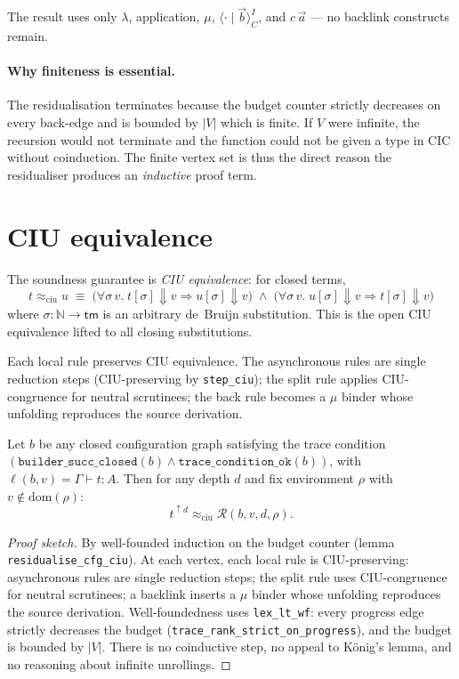 \documentclass[runningheads]{llncs}
\newcommand{\ciu}{\approx_{\mathrm{ciu}}}
\newcommand{\tconf}[3]{#1 \vdash #2 : #3}
\begin{document}
The result uses only $\lambda$, application, $\mu$, $\langle \cdot \mid \vec{b} \rangle^I_C$,
and $c\,\vec{a}$ — no backlink constructs remain.

\paragraph{Why finiteness is essential.}
The residualisation terminates because the budget counter strictly
decreases on every back-edge and is bounded by $|V|$ which is finite.
If $V$ were infinite, the recursion would not terminate and the function
could not be given a type in CIC without coinduction.  The finite vertex
set is thus the direct reason the residualiser produces an \emph{inductive}
proof term.

\section{CIU equivalence}

The soundness guarantee is \emph{CIU equivalence}: for closed terms,
\[
  t \ciu u \;\equiv\;
  \bigl(\forall \sigma\, v.\; t[\sigma] \Downarrow v \Rightarrow u[\sigma] \Downarrow v\bigr)
  \;\wedge\;
  \bigl(\forall \sigma\, v.\; u[\sigma] \Downarrow v \Rightarrow t[\sigma] \Downarrow v\bigr)
\]
where $\sigma : \mathbb{N} \to \mathsf{tm}$ is an arbitrary de~Bruijn
substitution.  This is the open CIU equivalence lifted to all closing
substitutions.

Each local rule preserves CIU equivalence.  The asynchronous rules are
single reduction steps (CIU-preserving by \texttt{step\_ciu}); the split
rule applies CIU-congruence for neutral scrutinees; the back rule becomes a
$\mu$ binder whose unfolding reproduces the source derivation.
\begin{theorem}
\label{thm:ciu}
Let $b$ be any closed configuration graph satisfying the trace condition
$(\texttt{builder\_succ\_closed}(b) \wedge \texttt{trace\_condition\_ok}(b))$,
with $\ell(b,v) = \tconf{\Gamma}{t}{A}$.  Then for any depth $d$ and fix
environment $\rho$ with $v\notin\mathrm{dom}(\rho)$:
\[
  t^{\uparrow d} \ciu \mathcal{R}(b,v,d,\rho).
\]
\end{theorem}

\begin{proof}[Proof sketch]
By well-founded induction on the budget counter (lemma
\texttt{residualise\_cfg\_ciu}).  At each vertex, each local rule is
CIU-preserving: asynchronous rules are single reduction steps; the split
rule uses CIU-congruence for neutral scrutinees; a backlink inserts a $\mu$
binder whose unfolding reproduces the source derivation.
Well-foundedness uses \texttt{lex\_lt\_wf}: every progress edge strictly
decreases the budget (\texttt{trace\_rank\_strict\_on\_progress}), and the
budget is bounded by $|V|$.  There is no coinductive step, no appeal to
K\"{o}nig's lemma, and no reasoning about infinite unrollings.
\end{proof}
\end{document}
